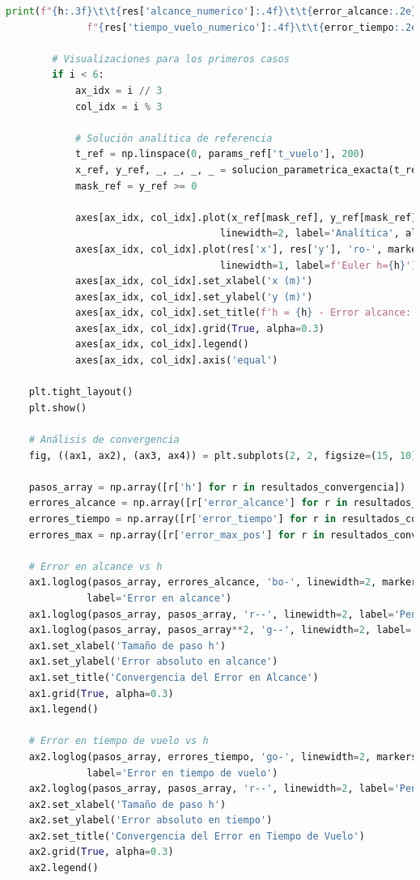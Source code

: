 \documentclass{article}
\begin{document}
\begin{lstlisting}[language=Python, caption={Método de Euler para movimiento parabólico con análisis de error}]
        print(f"{h:.3f}\t\t{res['alcance_numerico']:.4f}\t\t{error_alcance:.2e}\t\t"
              f"{res['tiempo_vuelo_numerico']:.4f}\t\t{error_tiempo:.2e}\t\t{error_max_pos:.2e}")
        
        # Visualizaciones para los primeros casos
        if i < 6:
            ax_idx = i // 3
            col_idx = i % 3
            
            # Solución analítica de referencia
            t_ref = np.linspace(0, params_ref['t_vuelo'], 200)
            x_ref, y_ref, _, _, _, _ = solucion_parametrica_exacta(t_ref)
            mask_ref = y_ref >= 0
            
            axes[ax_idx, col_idx].plot(x_ref[mask_ref], y_ref[mask_ref], 'b-', 
                                     linewidth=2, label='Analítica', alpha=0.8)
            axes[ax_idx, col_idx].plot(res['x'], res['y'], 'ro-', markersize=4, 
                                     linewidth=1, label=f'Euler h={h}')
            axes[ax_idx, col_idx].set_xlabel('x (m)')
            axes[ax_idx, col_idx].set_ylabel('y (m)')
            axes[ax_idx, col_idx].set_title(f'h = {h} - Error alcance: {error_alcance:.2e}')
            axes[ax_idx, col_idx].grid(True, alpha=0.3)
            axes[ax_idx, col_idx].legend()
            axes[ax_idx, col_idx].axis('equal')
    
    plt.tight_layout()
    plt.show()
    
    # Análisis de convergencia
    fig, ((ax1, ax2), (ax3, ax4)) = plt.subplots(2, 2, figsize=(15, 10))
    
    pasos_array = np.array([r['h'] for r in resultados_convergencia])
    errores_alcance = np.array([r['error_alcance'] for r in resultados_convergencia])
    errores_tiempo = np.array([r['error_tiempo'] for r in resultados_convergencia])
    errores_max = np.array([r['error_max_pos'] for r in resultados_convergencia])
    
    # Error en alcance vs h
    ax1.loglog(pasos_array, errores_alcance, 'bo-', linewidth=2, markersize=8, 
              label='Error en alcance')
    ax1.loglog(pasos_array, pasos_array, 'r--', linewidth=2, label='Pendiente = 1')
    ax1.loglog(pasos_array, pasos_array**2, 'g--', linewidth=2, label='Pendiente = 2')
    ax1.set_xlabel('Tamaño de paso h')
    ax1.set_ylabel('Error absoluto en alcance')
    ax1.set_title('Convergencia del Error en Alcance')
    ax1.grid(True, alpha=0.3)
    ax1.legend()
    
    # Error en tiempo de vuelo vs h
    ax2.loglog(pasos_array, errores_tiempo, 'go-', linewidth=2, markersize=8, 
              label='Error en tiempo de vuelo')
    ax2.loglog(pasos_array, pasos_array, 'r--', linewidth=2, label='Pendiente = 1')
    ax2.set_xlabel('Tamaño de paso h')
    ax2.set_ylabel('Error absoluto en tiempo')
    ax2.set_title('Convergencia del Error en Tiempo de Vuelo')
    ax2.grid(True, alpha=0.3)
    ax2.legend()
    

\end{lstlisting}
\end{document}

